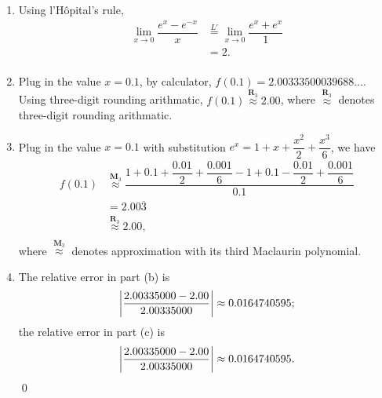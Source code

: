 \documentclass[11pt]{article}
\theoremstyle{break}
\numberwithin{equation}{theorem}
\begin{document}
\begin{enumerate}
    \item Using l'Hôpital's rule, \vspace{-0.6em}
    \begin{align*}
        \lim_{x\to 0}\dfrac{e^x-e^{-x}}{x}&\overset{L'}{=}\lim_{x\to 0}\dfrac{e^x+e^x}{1}\\
        &=2.\\[-3.4em]
    \end{align*}
    \item Plug in the value $x=0.1$, by calculator, $f(0.1)=2.00333500039688...$. Using three-digit rounding arithmatic, $f(0.1)\overset{\textbf{R}_3}{\approx}2.00$, where $\overset{\textbf{R}_3}{\approx}$ denotes three-digit rounding arithmatic.
    \item Plug in the value $x=0.1$ with substitution $e^x=1+x+\dfrac{x^2}{2}+\dfrac{x^3}{6}$, we have \vspace{-0.6em}
    \begin{align*}
        f(0.1)&\overset{\textbf{M}_{3}}{\approx}\dfrac{1+0.1+\dfrac{0.01}{2}+\dfrac{0.001}{6}-1+0.1-\dfrac{0.01}{2}+\dfrac{0.001}{6}}{0.1}\\
        &=2.00\overline{3}\\
        &\overset{\textbf{R}_3}{\approx}2.00,\\[-3.4em]
    \end{align*}
    where $\overset{\textbf{M}_{3}}{\approx}$ denotes approximation with its third Maclaurin polynomial.
    \item The relative error in part (b) is \vspace{-0.6em}
    \begin{equation*}
        \left|\dfrac{2.00335000-2.00}{2.00335000}\right|\approx0.0164740595; \vspace{-0.6em}
    \end{equation*}
    the relative error in part (c) is \vspace{-0.6em}
    \begin{equation*}
        \left|\dfrac{2.00335000-2.00}{2.00335000}\right|\approx0.0164740595. \vspace{-0.6em}
    \end{equation*}
    \qed
\end{enumerate}
\end{document}
